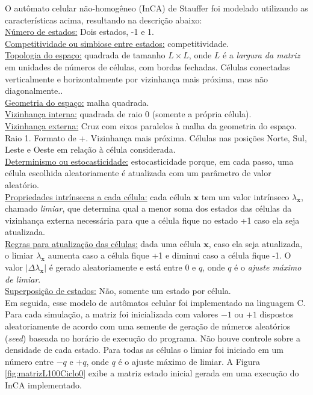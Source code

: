 \documentclass[
	12pt,				%
	openright,			%
	twoside,			%
	a4paper,			%
	english,			%
	french,				%
	spanish,			%
	brazil				%
	]{abntex2}
\begin{document}
O autômato celular não-homogêneo (InCA) de Stauffer \cite{stauffer} foi modelado utilizando as características acima, resultando na descrição abaixo:\\
\underline{Número de estados:} Dois estados, -1 e 1.\\
\underline{Competitividade ou simbiose entre estados:} competitividade.\\
\underline{Topologia do espaço:} quadrada de tamanho $L\times L$, onde $L$ é a \textit{largura da matriz} em unidades de números de células, com bordas fechadas. Células conectadas verticalmente e horizontalmente por vizinhança mais próxima, mas não diagonalmente..\\
\underline{Geometria do espaço:} malha quadrada.\\
\underline{Vizinhança interna:} quadrada de raio 0 (somente a própria célula).\\
\underline{Vizinhança externa:} Cruz com eixos paralelos à malha da geometria do espaço. Raio 1. Formato de +. Vizinhança mais próxima. Células nas posições Norte, Sul, Leste e Oeste em relação à célula considerada.\\
\underline{Determinismo ou estocasticidade:} estocasticidade porque, em cada passo, uma célula escolhida aleatoriamente é atualizada com um parâmetro de valor aleatório.\\
\underline{Propriedades intrínsecas a cada célula:} cada célula $\mathbf{x}$ tem um valor intrínseco $\lambda_\mathbf{x}$, chamado \textit{limiar}, que determina qual a menor soma dos estados das células da vizinhança externa necessária para que a célula fique no estado +1 caso ela seja atualizada.\\
\underline{Regras para atualização das células:}  dada uma célula $\mathbf{x}$, caso ela seja atualizada, o limiar $\lambda_\mathbf{x}$ aumenta caso a célula fique +1 e diminui caso a célula fique -1. O valor $|\Delta\lambda_\mathbf{x}|$ é gerado aleatoriamente e está entre $0$ e $q$, onde $q$ é o \textit{ajuste máximo de limiar}.\\
\underline{Superposição de estados:} Não, somente um estado por célula.\\

Em seguida, esse modelo de autômatos celular foi implementado na linguagem C. Para cada simulação, a matriz foi inicializada com valores $-1$ ou $+1$ dispostos aleatoriamente de acordo com uma semente de geração de números aleatórios (\textit{seed}) baseada no horário de execução do programa. Não houve controle sobre a densidade de cada estado. Para todas as células o limiar foi iniciado em um número entre $-q$ e $+q$, onde $q$ é o ajuste máximo de limiar. A Figura \ref{fig:matrizL100Ciclo0} exibe a matriz estado inicial gerada em uma execução do InCA implementado.
\end{document}
